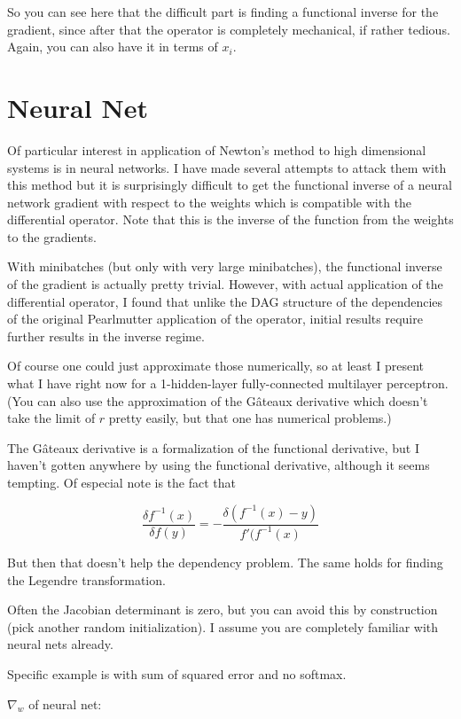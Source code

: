 \documentclass{article}
\begin{document}
So you can see here that the difficult part is finding a functional inverse for the gradient, since after that the operator is completely mechanical, if rather tedious. Again, you can also have it in terms of $x_i$.

\section{Neural Net}

Of particular interest in application of Newton's method to high dimensional systems is in neural networks. I have made several attempts to attack them with this method but it is surprisingly difficult to get the functional inverse of a neural network gradient with respect to the weights which is compatible with the differential operator. Note that this is the inverse of the function from the weights to the gradients.

With minibatches (but only with very large minibatches), the functional inverse of the gradient is actually pretty trivial. However, with actual application of the differential operator, I found that unlike the DAG structure of the dependencies of the original Pearlmutter application of the operator, initial results require further results in the inverse regime.

Of course one could just approximate those numerically, so at least I present what I have right now for a 1-hidden-layer fully-connected multilayer perceptron. (You can also use the approximation of the G\^{a}teaux derivative which doesn't take the limit of $r$ pretty easily, but that one has numerical problems.)

The G\^{a}teaux derivative is a formalization of the functional derivative, but I haven't gotten anywhere by using the functional derivative, although it seems tempting. Of especial note is the fact that

$$\frac{\delta f^{-1}(x)}{\delta f(y)} = - \frac{\delta(f^{-1}(x) - y)}{f'(f^{-1}(x)} $$

But then that doesn't help the dependency problem. The same holds for finding the Legendre transformation.

Often the Jacobian determinant is zero, but you can avoid this by construction (pick another random initialization). I assume you are completely familiar with neural nets already\cite{deeplearning}.

Specific example is with sum of squared error and no softmax.

$\nabla_w$ of neural net:
\end{document}
